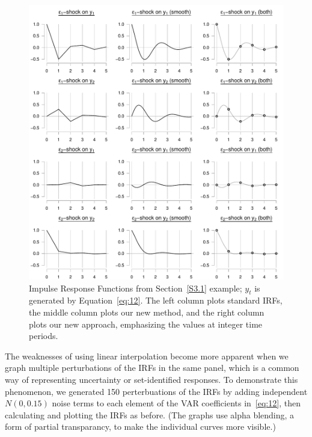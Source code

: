 \documentclass[12pt,fleqn]{article}
\begin{document}
\begin{figure}[t]
  \centering
  \includegraphics{graphs/numeric.pdf}
  \caption{Impulse Response Functions from Section~\ref{S3.1} example;
    $y_t$ is generated by Equation~\eqref{eq:12}. The left column
    plots standard IRFs, the middle column plots our new method, and
    the right column plots our new approach, emphasizing the values at
    integer time periods.}
  \label{fig:3}
\end{figure}

The weaknesses of using linear interpolation become more apparent when
we graph multiple perturbations of the IRFs in the same panel, which
is a common way of representing uncertainty or set-identified
responses. To demonstrate this phenomenon, we generated 150
perterbuations of the IRFs by adding independent $N(0, 0.15)$ noise
terms to each element of the VAR coefficients in~\eqref{eq:12}, then
calculating and plotting the IRFs as before. (The graphs use alpha
blending, a form of partial transparancy, to make the individual
curves more visible.)
\end{document}
